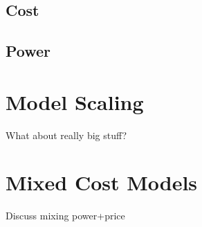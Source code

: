 \subsection{Cost}
\subsection{Power}

\section{Model Scaling}
What about really big stuff?

\section{Mixed Cost Models}
Discuss mixing power+price
